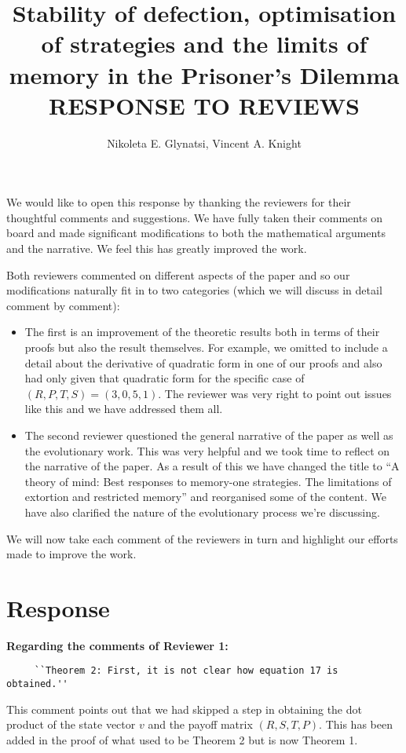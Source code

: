\documentclass{article}
\title{Stability of defection, optimisation of strategies and the limits of
memory in the Prisoner's Dilemma RESPONSE TO REVIEWS}
\author{Nikoleta E. Glynatsi, Vincent A. Knight}
\begin{document}
\maketitle

We would like to open this response by thanking the reviewers for their
thoughtful comments and suggestions. We have fully taken their comments on board
and made significant modifications to both the mathematical arguments and the narrative. We feel this has greatly improved the work.

Both reviewers commented on different aspects of the paper and so our modifications
naturally fit in to two categories (which we will discuss in detail comment by comment):

\begin{itemize}
    \item The first is an improvement of the theoretic results both in terms of
    their proofs but also the result themselves. For example, we omitted to
    include a detail about the derivative of quadratic form in one of our proofs
    and also had only given that quadratic form for the specific case of \((R,
    P, T, S)=(3, 0, 5, 1)\). The reviewer was very right to point out issues
    like this and we have addressed them all.
    \item The second reviewer questioned the general narrative of the paper as
    well as the evolutionary work. This was very helpful and we took time to
    reflect on the narrative of the paper. As a result of this we have changed
    the title to ``A theory of mind: Best responses to memory-one strategies.
    The limitations of extortion and restricted memory'' and reorganised some of
    the content. We have also clarified the nature of the evolutionary process
    we're discussing.
\end{itemize}

We will now take each comment of the reviewers in turn and highlight our efforts
made to improve the work.

\section{Response}

\textbf{Regarding the comments of Reviewer 1:}

\begin{verbatim}
     ``Theorem 2: First, it is not clear how equation 17 is obtained.''
\end{verbatim}

This comment points out that we had skipped a step in obtaining the dot product
of the state vector \(v\) and the payoff matrix \((R, S, T, P)\).
This has been added in the proof of what used to be Theorem 2 but is now Theorem 1.
\end{document}
